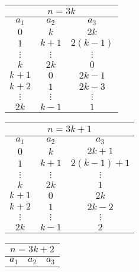 \begin{table}[H]
\centering
\begin{minipage}{.3\linewidth}
    \centering
    \begin{tabular}{|c|c|c|}
        \hline
        \multicolumn{3}{|c|}{$n = 3k$} \\ \hline
        $a_1$ & $a_2$ & $a_3$ \\ \hline
        $0$ & $k$ & $2k$ \\ \hline
        $1$ & $k + 1$ & $2(k - 1)$ \\ \hline
        $\vdots$ & $\vdots$ & $\vdots$ \\ \hline
        $k$ & $2k$ & $0$ \\ \hline
        $k + 1$ & $0$ & $2k - 1$ \\ \hline
        $k + 2$ & $1$ & $2k - 3$ \\ \hline
        $\vdots$ & $\vdots$ & $\vdots$ \\ \hline
        $2k$ & $k - 1$ & $1$ \\ \hline
    \end{tabular}
\end{minipage}
\begin{minipage}{.3\linewidth}
    \centering
    \begin{tabular}{|c|c|c|}
        \hline
        \multicolumn{3}{|c|}{$n = 3k + 1$} \\ \hline
        $a_1$ & $a_2$ & $a_3$ \\ \hline
        $0$ & $k$ & $2k + 1$ \\ \hline
        $1$ & $k + 1$ & $2(k - 1) + 1$ \\ \hline
        $\vdots$ & $\vdots$ & $\vdots$ \\ \hline
        $k$ & $2k$ & $1$ \\ \hline
        $k + 1$ & $0$ & $2k$ \\ \hline
        $k + 2$ & $1$ & $2k - 2$ \\ \hline
        $\vdots$ & $\vdots$ & $\vdots$ \\ \hline
        $2k$ & $k - 1$ & $2$ \\ \hline
    \end{tabular}
\end{minipage}
\begin{minipage}{.3\linewidth}
    \centering
    \begin{tabular}{|c|c|c|}
        \hline
        \multicolumn{3}{|c|}{$n = 3k + 2$} \\ \hline
        $a_1$ & $a_2$ & $a_3$ \\ \hline

\end{tabular}
\end{minipage}
\end{table}
